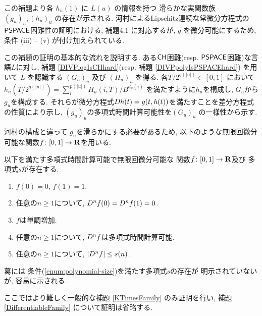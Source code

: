  この補題より各 $h_u(1)$ に $L(u)$ の情報を持つ
 滑らかな実関数族 $(g_u)_u, (h_u)_u$ の存在が示される.
 河村によるLipschitz連続な常微分方程式の$\mathsf{PSPACE}$困難性の証明における,
 補題4.1 に対応するが,
 $g$ を微分可能にするため, 条件 (iii) -- (v) が付け加えられている.


 この補題の証明の基本的な流れを説明する.
 ある$\mathsf{CH}$困難(resp. $\mathsf{PSPACE}$困難)な言語$L$に対し, 
 補題 \ref{DIVPlogIsCHhard}(resp. 補題 \ref{DIVPpolyIsPSPACEhard})
 を用いて $L$ を認識する $(G_u)_u$ 及び $(H_u)_u$ を得る.
 各$T/2^{q(|u|)} \in [0,1]$ において
 $h_u(T/2^{q(|u|)}) = \sum^{p(|u|)}_{i}H_u(i, T)/B^{d_u(i)}$
 を満たすように$h_u$を構成し, $G_u$から$g_u$を構成する.
 それらが微分方程式$D h(t) = g(t, h(t))$を満たすことを差分方程式の性質により示し,
 $(g_u)_u$の多項式時間計算可能性を$(G_u)_u$ の一様性から示す.

 河村\cite[補題4.1]{kawamura2010lipschitz}の構成と違って
 $g_u$を滑らかにする必要があるため, 
 以下のような無限回微分可能な関数$f \colon [0,1] \to \mathbf R$を用いる. 

 \begin{lemma}
  \label{SmoothFunction}
  以下を満たす多項式時間計算可能で無限回微分可能な
  関数$f \colon [0,1] \to \mathbf R$及び
  多項式$s$が存在する.
  \begin{enumerate}
   \item $f(0) = 0$, $f(1) = 1$. 
   \item 任意の$n \ge 1$について, $D ^n f (0) = D ^n f (1) = 0$. 
   \item $f$は単調増加. 
   \item 任意の$n \ge 1$について, $D ^n f$は多項式時間計算可能.
   \item \label{enum:polynomial-size}
     任意の$n \ge 1$について, $|D^n f| \le s(n)$. 
  \end{enumerate}
 \end{lemma}

葛\cite[補題3.6]{ko1991complexity}には
条件(\ref{enum:polynomial-size})を満たす多項式$s$の存在が
明示されていないが, 
容易に示される.

 ここではより難しく一般的な補題 \ref{KTimesFamily} のみ証明を行い,
 補題 \ref{DifferentiableFamily} について証明は省略する.


